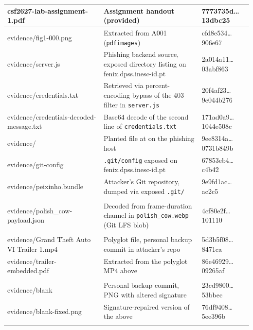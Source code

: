 \documentclass[11pt,a4paper,final,oneside]{article}
\begin{document}
\begin{xltabular}{\textwidth}{
>{\centering\arraybackslash}p{0.25\textwidth}
>{\centering\arraybackslash}p{0.22\textwidth}
>{\centering\arraybackslash}X}
csf2627-lab-assignment-1.pdf & Assignment handout (provided) & 7773735d\ldots{}13dbc25 \\
\hline
evidence/fig1-000.png & Extracted from A001 (\texttt{pdfimages}) & cfd8e534\ldots{}906e67 \\
\hline
evidence/server.js & Phishing backend source, exposed directory listing on fenix.dpss.inesc-id.pt & 2a014a11\ldots{}03abf863 \\
\hline
evidence/credentials.txt & Retrieved via percent-encoding bypass of the 403 filter in \texttt{server.js} & 20f4af23\ldots{}9e044b276 \\
\hline
evidence/credentials-decoded-message.txt & Base64 decode of the second line of \texttt{credentials.txt} & 171ad0a9\ldots{}1044e508c \\
\hline
evidence/ & Planted file at  on the phishing host & 9ee8314a\ldots{}0731b849b \\
\hline
evidence/git-config & \texttt{.git/config} exposed on fenix.dpss.inesc-id.pt & 67853eb4\ldots{}c4b42 \\
\hline
evidence/peixinho.bundle & Attacker's Git repository, dumped via exposed \texttt{.git/} & 9e9fd1ac\ldots{}ac2c5 \\
\hline
{} \\
\hline
evidence/polish\_cow-payload.json & Decoded from frame-duration channel in \texttt{polish\_cow.webp} (Git LFS blob) & 4cf80e2f\ldots{}101110 \\
\hline
{} \\
\hline
evidence/Grand Theft Auto VI Trailer 1.mp4 & Polyglot file, personal backup commit in attacker's repo & 5d3b5f08\ldots{}8471ca \\
\hline
evidence/trailer-embedded.pdf & Extracted from the polyglot MP4 above & 86e46929\ldots{}09265af \\
\hline
{} \\
\hline
evidence/blank & Personal backup commit, PNG with altered signature & 23cd9800\ldots{}53bbec \\
\hline
evidence/blank-fixed.png & Signature-repaired version of the above & 76df9408\ldots{}5ee396b \\
\hline
{} \\

\end{xltabular}
\end{document}
